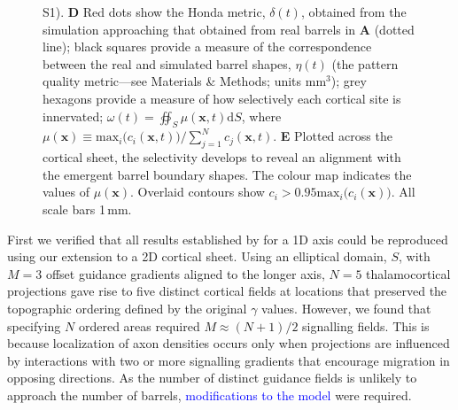 \documentclass[9pt,lineno]{elife}
\newcommand{\cmnt}[1]{\textcolor{blue}{#1}}
\newcommand{\metrics}[1]{\textcolor{revred}{#1}}
\newcommand{\mb}[1]{\mathbf{#1}}
\begin{document}
\begin{figure}
\begin{fullwidth}
{      S1). \textbf{D} Red dots show the Honda metric, \metrics{$\delta(t)$}, obtained from \metrics{the}
      simulation approaching that obtained from \metrics{real} barrels in \textbf{A} (dotted
      line); black squares \metrics{provide a} measure \metrics{of} the correspondence
      between the real and
      simulated barrel shapes, $\eta(t)$ (the \metrics{pattern quality metric---see
        Materials \& Methods; units mm$^3$});
      \metrics{grey hexagons \metrics{provide a measure of how selectively each
          cortical site is innervated};
        $\omega(t) = \oiint_{S} \mu(\mb{x},t) \mathrm{d}S$, where
        $\mu(\mb{x}) \equiv \mathrm{max}_i\big(c_i(\mb{x},t)\big)\big/\sum_{j=1}^{N} c_j(\mb{x},t)$.}
      \textbf{E} \metrics{Plotted across the cortical sheet, the selectivity
        develops to reveal an alignment with the emergent barrel boundary
        shapes}. \metrics{The colour map
        indicates the values of $\mu(\mb{x})$. Overlaid
        contours show $c_i > 0.95 \mathrm{max}_i\big(c_i(\mb{x})\big)$.} All scale bars 1\,mm.}
    \label{fig:main}
  \end{fullwidth}
\end{figure}

First we verified that all results established by \cite{karbowski_model_2004}
for a 1D axis could be reproduced using our extension to a 2D cortical
sheet. Using an elliptical domain, $S$, with $M=3$ offset guidance gradients
aligned to the longer axis, $N=5$ thalamocortical projections gave rise to
five distinct cortical fields at locations that preserved the topographic
ordering defined by the original $\gamma$ values. However, we found that
specifying $N$ ordered areas required $M\approx (N+1)/2$ signalling
fields. This is because localization of axon densities occurs only when
projections are influenced by interactions with two or more signalling
gradients that encourage migration in opposing directions.
%
%
As the number of distinct guidance fields is unlikely to
approach the number of barrels, \cmnt{modifications to the model} were required.
\end{document}
